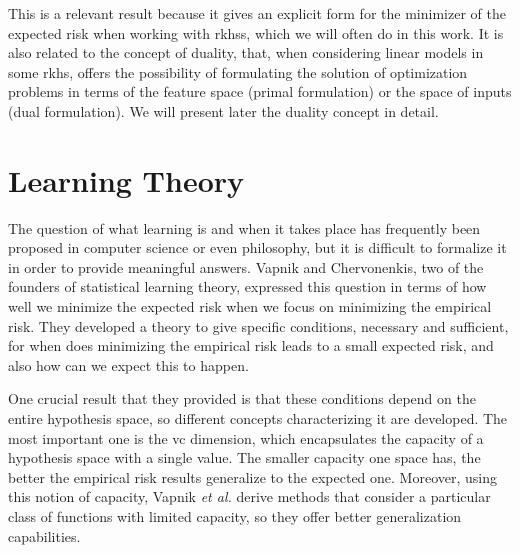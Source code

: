 This is a relevant result because it gives an explicit form for the minimizer of the expected risk when working with \acrshort{rkhss}, which we will often do in this work. It is also related to the concept of duality, that, when considering linear models in some \acrshort{rkhs}, offers the possibility of formulating the solution of optimization problems in terms of the feature space (primal formulation) or the space of inputs (dual formulation). We will present later the duality concept in detail. 



















\section{Learning Theory}\label{sec:learning_theory}
% 
%




The question of what learning is and when it takes place has frequently been proposed in computer science or even philosophy, but it is difficult to formalize it in order to provide meaningful answers. Vapnik and Chervonenkis, two of the founders of statistical learning theory, expressed this question in terms of how well we minimize the expected risk when we focus on minimizing the empirical risk.
%
They developed a theory to give specific conditions, necessary and sufficient, for when does minimizing the empirical risk leads to a small expected risk, and also how can we expect this to happen.

%
One crucial result that they provided is that these conditions depend on the entire hypothesis space, so different concepts characterizing it are developed. The most important one is the \acrfull{vc} dimension, which encapsulates the capacity of a hypothesis space with a single value. The smaller capacity one space has, the better the empirical risk results generalize to the expected one.
%
Moreover, using this notion of capacity, Vapnik \emph{et al.} derive methods that consider a particular class of functions with limited capacity, so they offer better generalization capabilities.


